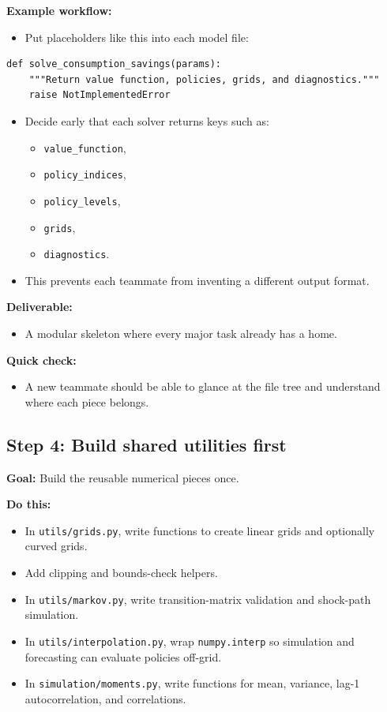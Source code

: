 \documentclass[11pt]{article}
\begin{document}
\textbf{Example workflow:}
\begin{itemize}
    \item Put placeholders like this into each model file:
\end{itemize}
\begin{lstlisting}
def solve_consumption_savings(params):
    """Return value function, policies, grids, and diagnostics."""
    raise NotImplementedError
\end{lstlisting}
\begin{itemize}
    \item Decide early that each solver returns keys such as:
    \begin{itemize}
        \item \verb|value_function|,
        \item \verb|policy_indices|,
        \item \verb|policy_levels|,
        \item \verb|grids|,
        \item \verb|diagnostics|.
    \end{itemize}
    \item This prevents each teammate from inventing a different output format.
\end{itemize}

\textbf{Deliverable:}
\begin{itemize}
    \item A modular skeleton where every major task already has a home.
\end{itemize}

\textbf{Quick check:}
\begin{itemize}
    \item A new teammate should be able to glance at the file tree and understand where each piece belongs.
\end{itemize}

\subsection{Step 4: Build shared utilities first}
\textbf{Goal:} Build the reusable numerical pieces once.

\textbf{Do this:}
\begin{itemize}
    \item In \verb|utils/grids.py|, write functions to create linear grids and optionally curved grids.
    \item Add clipping and bounds-check helpers.
    \item In \verb|utils/markov.py|, write transition-matrix validation and shock-path simulation.
    \item In \verb|utils/interpolation.py|, wrap \verb|numpy.interp| so simulation and forecasting can evaluate policies off-grid.
    \item In \verb|simulation/moments.py|, write functions for mean, variance, lag-1 autocorrelation, and correlations.
\end{itemize}
\end{document}
